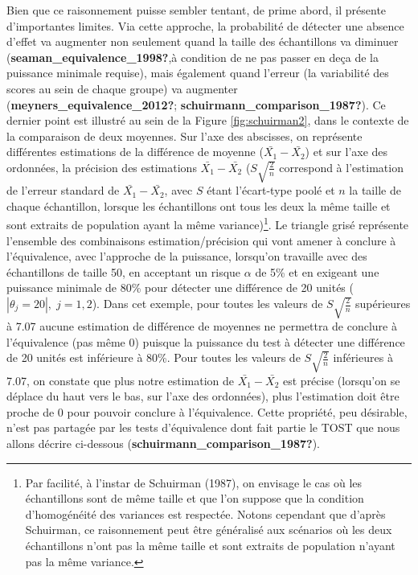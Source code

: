 \documentclass[
  english,
  man]{apa6}
\begin{document}
Bien que ce raisonnement puisse sembler tentant, de prime abord, il présente d'importantes limites. Via cette approche, la probabilité de détecter une absence d'effet va augmenter non seulement quand la taille des échantillons va diminuer (\textbf{seaman\_equivalence\_1998?},à condition de ne pas passer en deça de la puissance minimale requise), mais également quand l'erreur (la variabilité des scores au sein de chaque groupe) va augmenter (\textbf{meyners\_equivalence\_2012?}; \textbf{schuirmann\_comparison\_1987?}). Ce dernier point est illustré au sein de la Figure \ref{fig:schuirman2}, dans le contexte de la comparaison de deux moyennes. Sur l'axe des abscisses, on représente différentes estimations de la différence de moyenne (\(\bar{X_1}-\bar{X_2}\)) et sur l'axe des ordonnées, la précision des estimations \(\bar{X_1}-\bar{X_2}\) (\(S\sqrt{\frac{2}{n}}\) correspond à l'estimation de l'erreur standard de \(\bar{X_1}-\bar{X_2}\), avec \(S\) étant l'écart-type poolé et \(n\) la taille de chaque échantillon, lorsque les échantillons ont tous les deux la même taille et sont extraits de population ayant la même variance)\footnote{Par facilité, à l'instar de Schuirman (1987), on envisage le cas où les échantillons sont de même taille et que l'on suppose que la condition d'homogénéité des variances est respectée. Notons cependant que d'après Schuirman, ce raisonnement peut être généralisé aux scénarios où les deux échantillons n'ont pas la même taille et sont extraits de population n'ayant pas la même variance.}. Le triangle grisé représente l'ensemble des combinaisons estimation/précision qui vont amener à conclure à l'équivalence, avec l'approche de la puissance, lorsqu'on travaille avec des échantillons de taille 50, en acceptant un risque \(\alpha\) de 5\% et en exigeant une puissance minimale de 80\% pour détecter une différence de 20 unités (\(|\theta_j=20|,\;j=1,2\)). Dans cet exemple, pour toutes les valeurs de \(S\sqrt{\frac{2}{n}}\) supérieures à 7.07 aucune estimation de différence de moyennes ne permettra de conclure à l'équivalence (pas même 0) puisque la puissance du test à détecter une différence de 20 unités est inférieure à 80\%. Pour toutes les valeurs de \(S\sqrt{\frac{2}{n}}\) inférieures à 7.07, on constate que plus notre estimation de \(\bar{X_1}-\bar{X_2}\) est précise (lorsqu'on se déplace du haut vers le bas, sur l'axe des ordonnées), plus l'estimation doit être proche de 0 pour pouvoir conclure à l'équivalence. Cette propriété, peu désirable, n'est pas partagée par les tests d'équivalence dont fait partie le TOST que nous allons décrire ci-dessous (\textbf{schuirmann\_comparison\_1987?}).
\end{document}
